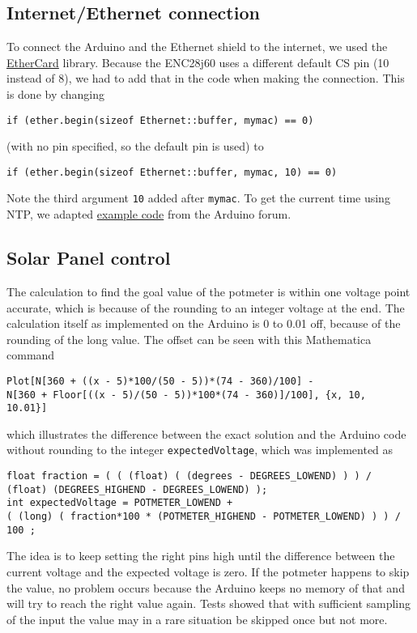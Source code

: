 		\subsection{Internet/Ethernet connection}\label{subsec:internet/ethernetConnection}
			To connect the Arduino and the Ethernet shield to the internet, we used the \href{https://github.com/jcw/ethercard}{EtherCard} library.
			Because the ENC28j60 uses a different default CS pin (10 instead of 8), we had to add that in the code when making the connection.
			This is done by changing
			\begin{lstlisting}
if (ether.begin(sizeof Ethernet::buffer, mymac) == 0)
			\end{lstlisting}
			(with no pin specified, so the default pin is used) to
			\begin{lstlisting}
if (ether.begin(sizeof Ethernet::buffer, mymac, 10) == 0)
			\end{lstlisting}
			Note the third argument \lstinline|10| added after \lstinline|mymac|.
			To get the current time using NTP, we adapted \href{http://forum.arduino.cc/index.php?topic=171941.0}{example code} from the Arduino forum.
		\subsection{Solar Panel control}\label{subsec:solarPanelControl}
			The calculation to find the goal value of the potmeter is within one voltage point accurate, which is because of the rounding to an integer voltage at the end.
			The calculation itself as implemented on the Arduino is 0 to 0.01 off, because of the rounding of the long value.
			 The offset can be seen with this Mathematica command
			\begin{lstlisting}
Plot[N[360 + ((x - 5)*100/(50 - 5))*(74 - 360)/100] -
N[360 + Floor[((x - 5)/(50 - 5))*100*(74 - 360)]/100], {x, 10,
10.01}]
			\end{lstlisting}
			which illustrates the difference between the exact solution and the Arduino code without rounding to the integer \verb|expectedVoltage|, which was implemented as
			\begin{lstlisting}
float fraction = ( ( (float) ( (degrees - DEGREES_LOWEND) ) ) / (float) (DEGREES_HIGHEND - DEGREES_LOWEND) );
int expectedVoltage = POTMETER_LOWEND +
( (long) ( fraction*100 * (POTMETER_HIGHEND - POTMETER_LOWEND) ) ) / 100 ;
			\end{lstlisting}
			The idea is to keep setting the right pins high until the difference between the current voltage and the expected voltage is zero.
			If the potmeter happens to skip the value, no problem occurs because the Arduino keeps no memory of that and will try to reach the right value again.
			Tests showed that with sufficient sampling of the input the value may in a rare situation be skipped once but not more.
